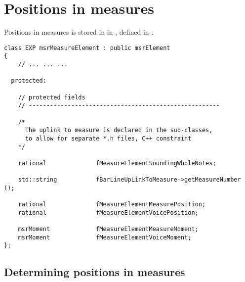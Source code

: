 

\chapter{Positions in measures}

Positions in measures is stored in  in , defined in :
\begin{lstlisting}[language=CPlusPlus]
class EXP msrMeasureElement : public msrElement
{
	// ... ... ...

  protected:

    // protected fields
    // ------------------------------------------------------

    /*
      The uplink to measure is declared in the sub-classes,
      to allow for separate *.h files, C++ constraint
    */

    rational              fMeasureElementSoundingWholeNotes;

    std::string           fBarLineUpLinkToMeasure->getMeasureNumber ();

    rational              fMeasureElementMeasurePosition;
    rational              fMeasureElementVoicePosition;

    msrMoment             fMeasureElementMeasureMoment;
    msrMoment             fMeasureElementVoiceMoment;
};
\end{lstlisting}

\section{Determining positions in measures}

